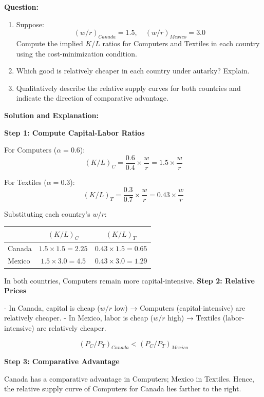 \documentclass[12pt]{article}
\begin{document}
\noindent\textbf{Question:}
\begin{enumerate}
    \item Suppose:
    \[
    (w/r)_{Canada} = 1.5, \quad (w/r)_{Mexico} = 3.0
    \]
    Compute the implied \(K/L\) ratios for Computers and Textiles in each country using the cost-minimization condition.
    \item Which good is relatively cheaper in each country under autarky? Explain.
    \item Qualitatively describe the relative supply curves for both countries and indicate the direction of comparative advantage.
\end{enumerate}

\noindent\textbf{Solution and Explanation:}

\textbf{Step 1: Compute Capital-Labor Ratios}

For Computers (\(\alpha = 0.6\)):
\[
(K/L)_C = \frac{0.6}{0.4} \times \frac{w}{r} = 1.5 \times \frac{w}{r}
\]

For Textiles (\(\alpha = 0.3\)):
\[
(K/L)_T = \frac{0.3}{0.7} \times \frac{w}{r} = 0.43 \times \frac{w}{r}
\]

Substituting each country's \(w/r\):

\begin{center}
\begin{tabular}{lcc}
\toprule
 & \((K/L)_C\) & \((K/L)_T\) \\
\midrule
Canada & $1.5 \times 1.5 = 2.25$ & $0.43 \times 1.5 = 0.65$ \\
Mexico & $1.5 \times 3.0 = 4.5$ & $0.43 \times 3.0 = 1.29$ \\
\bottomrule
\end{tabular}
\end{center}

\noindent
In both countries, Computers remain more capital-intensive.
\newpage
\textbf{Step 2: Relative Prices}

- In Canada, capital is cheap (\(w/r\) low) → Computers (capital-intensive) are relatively cheaper.  
- In Mexico, labor is cheap (\(w/r\) high) → Textiles (labor-intensive) are relatively cheaper.  

\[
(P_C/P_T)_{Canada} < (P_C/P_T)_{Mexico}
\]

\textbf{Step 3: Comparative Advantage}

Canada has a comparative advantage in Computers; Mexico in Textiles.  
Hence, the relative supply curve of Computers for Canada lies farther to the right.
\end{document}
